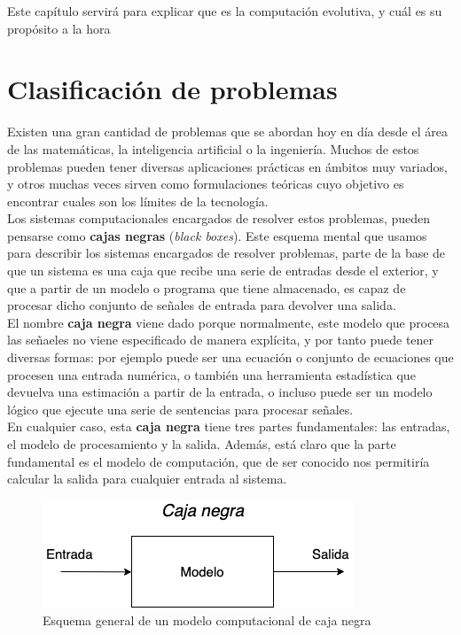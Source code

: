 
Este capítulo servirá para explicar que es la computación evolutiva, y cuál es su propósito a la hora 

\section{Clasificación de problemas}
\label{1:sec:1}

Existen una gran cantidad de problemas que se abordan hoy en día desde el área de las matemáticas, la inteligencia artificial o la ingeniería. Muchos de estos problemas pueden tener diversas aplicaciones prácticas en ámbitos muy variados, y otros muchas veces sirven como formulaciones teóricas cuyo objetivo es encontrar cuales son los límites de la tecnología. \\

Los sistemas computacionales encargados de resolver estos problemas, pueden pensarse como \textbf{cajas negras} (\textit{black boxes}). Este esquema mental que usamos para describir los sistemas encargados de resolver problemas, parte de la base de que un sistema es una caja que recibe una serie de entradas desde el exterior, y que a partir de un modelo o programa que tiene almacenado, es capaz de procesar dicho conjunto de señales de entrada para devolver una salida. \\

El nombre \textbf{caja negra} viene dado porque normalmente, este modelo que procesa las señaeles no viene especificado de manera explícita, y por tanto puede tener diversas formas: por ejemplo puede ser una ecuación o conjunto de ecuaciones que procesen una entrada numérica, o también una herramienta estadística que devuelva una estimación a partir de la entrada, o incluso puede ser un modelo lógico que ejecute una serie de sentencias para procesar señales. \\

En cualquier caso, esta \textbf{caja negra} tiene tres partes fundamentales: las entradas, el modelo de procesamiento y la salida. Además, está claro que la parte fundamental es el modelo de computación, que de ser conocido nos permitiría calcular la salida para cualquier entrada al sistema.

\begin{figure}[ht]
    \centering
    \includegraphics[scale=0.6]{mem/images/cap-1/1-1.png}
    \caption{Esquema general de un modelo computacional de caja negra}
    \label{fig:my_label}
\end{figure}


